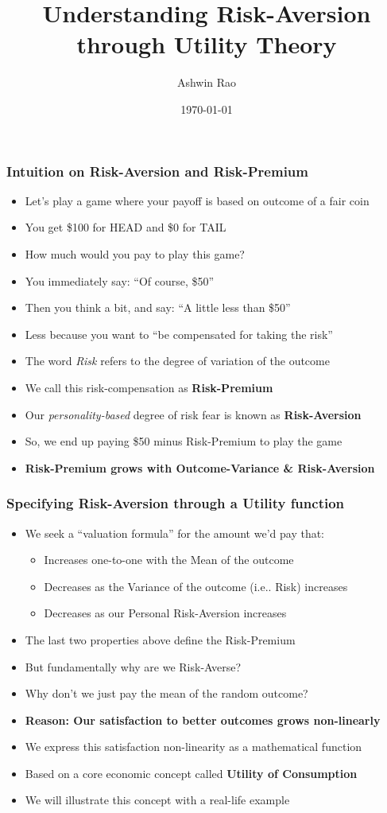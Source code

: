 \documentclass[handout]{beamer}
\title[Utility Theory]{Understanding Risk-Aversion through Utility Theory} %
\author{Ashwin Rao} %
\institute[Stanford] %
{
ICME, Stanford University
}
\date{\today} %
\begin{document}
\begin{frame}
\titlepage %
\end{frame}

\begin{frame}
\frametitle{Intuition on Risk-Aversion and Risk-Premium}
\pause
\begin{itemize}[<+->]
\item Let's play a game where your payoff is based on outcome of a fair coin
\item You get \$100 for HEAD and \$0 for TAIL
\item How much would you pay to play this game?
\item You immediately say: ``Of course, \$50''
\item Then you think a bit, and say: ``A little less than \$50''
\item Less because you want to ``be compensated for taking the risk''
\item The word {\em Risk} refers to the degree of variation of the outcome
\item We call this risk-compensation as {\bf Risk-Premium}
\item Our {\em personality-based} degree of risk fear is known as {\bf Risk-Aversion}
\item So, we end up paying \$50 minus Risk-Premium to play the game
\item {\bf Risk-Premium grows with Outcome-Variance \& Risk-Aversion}
\end{itemize}
\end{frame}

\begin{frame}
\frametitle{Specifying Risk-Aversion through a Utility function}
\pause
\begin{itemize}[<+->]
\item We seek a ``valuation formula'' for the amount we'd pay that:
\begin{itemize}
\item Increases one-to-one with the Mean of the outcome
\item Decreases as the Variance of the outcome (i.e.. Risk) increases
\item Decreases as our Personal Risk-Aversion increases
\end{itemize}
\item The last two properties above define the Risk-Premium
\item But fundamentally why are we Risk-Averse?
\item Why don't we just pay the mean of the random outcome?
\item {\bf Reason: Our satisfaction to better outcomes grows non-linearly}
\item We express this satisfaction non-linearity as a mathematical function
\item Based on a core economic concept called {\bf Utility of Consumption}
\item We will illustrate this concept with a real-life example
\end{itemize}
\end{frame}
\end{document}
